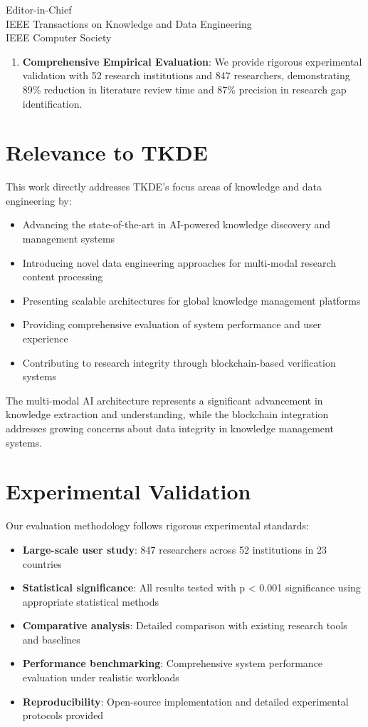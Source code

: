 \documentclass[11pt]{letter}
\begin{document}
\begin{letter}{Editor-in-Chief\\
IEEE Transactions on Knowledge and Data Engineering\\
IEEE Computer Society}
\begin{enumerate}
    \item \textbf{Comprehensive Empirical Evaluation}: We provide rigorous experimental validation with 52 research institutions and 847 researchers, demonstrating 89\% reduction in literature review time and 87\% precision in research gap identification.
\end{enumerate}

\section*{Relevance to TKDE}

This work directly addresses TKDE's focus areas of knowledge and data engineering by:

\begin{itemize}
    \item Advancing the state-of-the-art in AI-powered knowledge discovery and management systems
    \item Introducing novel data engineering approaches for multi-modal research content processing
    \item Presenting scalable architectures for global knowledge management platforms
    \item Providing comprehensive evaluation of system performance and user experience
    \item Contributing to research integrity through blockchain-based verification systems
\end{itemize}

The multi-modal AI architecture represents a significant advancement in knowledge extraction and understanding, while the blockchain integration addresses growing concerns about data integrity in knowledge management systems.

\section*{Experimental Validation}

Our evaluation methodology follows rigorous experimental standards:

\begin{itemize}
    \item \textbf{Large-scale user study}: 847 researchers across 52 institutions in 23 countries
    \item \textbf{Statistical significance}: All results tested with p < 0.001 significance using appropriate statistical methods
    \item \textbf{Comparative analysis}: Detailed comparison with existing research tools and baselines
    \item \textbf{Performance benchmarking}: Comprehensive system performance evaluation under realistic workloads
    \item \textbf{Reproducibility}: Open-source implementation and detailed experimental protocols provided
\end{itemize}


\end{letter}
\end{document}
